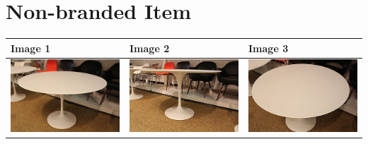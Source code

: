 \section{Non-branded Item}
\begin{table}[h!]
	\begin{center}
	\begin{tabular}{| l | l | l |}
	\hline
	Image 1 & Image 2 & Image 3 \\
	\hline
	\includegraphics[scale=0.25]{images/ground_truth/8/image_1} & \includegraphics[scale=0.25]{images/ground_truth/8/image_2} & \includegraphics[scale=0.25]{images/ground_truth/8/image_3} \\

\end{tabular}
\end{center}
\end{table}
